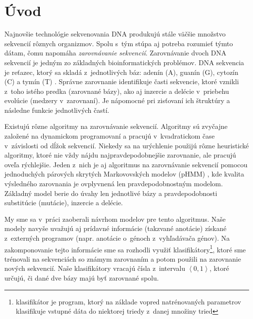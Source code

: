 \chapter*{Úvod}
{}

Najnovšie technológie sekvenovania DNA produkujú stále väčšie množstvo sekvencií rôznych organizmov. Spolu s~tým stúpa aj potreba rozumieť týmto dátam, čomu napomáha \textit{zarovnávanie sekvencií}.
Zarovnávanie dvoch DNA sekvencií je jedným zo základných
bioinformatických problémov.
DNA sekvencia je reťazec, ktorý sa skladá z~jednotlivých báz: adenín (A), guanín (G), cytozín (C) a tymín (T) \cite{wiki:dna}.
Správne zarovnanie identifikuje časti
sekvencie, ktoré vznikli z~toho istého predka (zarovnané bázy), ako aj
inzercie a delécie v~priebehu evolúcie (medzery v~zarovnaní).
Je nápomocné pri zisťovaní ich štruktúry a následne funkcie jednotlivých častí.

Existujú rôzne algoritmy na zarovnávanie sekvencií.
Algoritmy sú zvyčajne založené na dynamickom programovaní a pracujú v~kvadratickom čase v~závislosti od dĺžok sekvencií. Niekedy sa na urýchlenie použijú rôzne heuristické algoritmy, ktoré nie vždy nájdu najpravdepodobnejšie zarovnanie, ale pracujú oveľa rýchlejšie. Jeden z~nich je aj algoritmus na zarovnávanie sekvencií pomocou jednoduchých párových skrytých Markovovských modelov (pHMM) \cite{durbin}, kde kvalita výsledného zarovnania je ovplyvnená len pravdepodobnostným modelom.
Základný model berie do úvahy len jednotlivé bázy a pravdepodobnosti substitúcie (mutácie), inzercie a delécie.

My sme sa v~práci zaoberali návrhom modelov pre tento algoritmus. Naše modely navyše uvažujú aj prídavné informácie (takzvané anotácie) získané z~externých programov (napr. anotácie o~génoch z~vyhľadávača génov). Na zakomponovanie tejto informácie sme sa rozhodli využiť klasifikátory\footnote{klasifikátor je program, ktorý na základe vopred natrénovaných parametrov klasifikuje vstupné dáta do niektorej triedy z~danej množiny tried}, ktoré  sme trénovali na sekvenciách so známym zarovnaním a potom použili na zarovnanie nových sekvencií. Naše klasifikátory vracajú čísla z~intervalu $\left<0, 1\right>$, ktoré určujú, či dané dve bázy majú byť zarovnané spolu.

